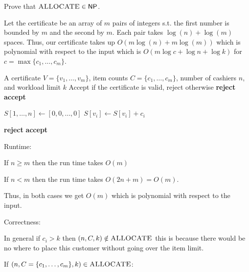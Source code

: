 \documentclass[12pt, letterpaper]{article}
\newcommand{\NP}{\mathsf{NP}}
\begin{document}
\begin{subproblem}{}
    Prove that $\textsc{ALLOCATE} \in \NP$.
\end{subproblem}
\begin{problemproof}
    Let the certificate be an array of $m$ pairs of integers s.t. the first number is bounded by $m$ and the second by $m$. Each pair takes $\log(n)+ \log(m)$ spaces. Thus, our certificate takes up $O(m \log(n) + m\log(m))$ which is polynomial with respect to the input which is $O(m \log c + \log n + \log k)$ for $c = \max\{c_1,\dots,c_m\}$.

    \begin{algorithm}[H]
        \caption{Verify Certificate for ALLOCATE}
        \begin{algorithmic}[1]
            \Require A certificate $V = \{v_1, \dots, v_m\}$, item counts $C=\{c_1,\dots,c_m\}$, number of cashiers $n$, and workload limit $k$
            \Ensure Accept if the certificate is valid, reject otherwise
                     \Return \textbf{reject}
                    \EndIf
                \EndFor
                \State \Return \textbf{accept}
            \EndIf

            \State $S[1,\dots,n] \gets [0,0,\dots,0]$
                \State $S[v_i] \gets S[v_i] + c_i$
            \EndFor

                 \Return \textbf{reject}
                \EndIf
            \EndFor
            \State \Return \textbf{accept}
        \end{algorithmic}
        \end{algorithm}
    
        Runtime: 
        
        If $n \geq m$ then the run time takes $O(m)$

        If $n < m$ then the run time takes $O(2n+m)=O(m)$.

        Thus, in both cases we get $O(m)$ which is polynomial with respect to the input.

        Correctness:

        In general if $c_i > k$ then $(n,C,k) \notin \textsc{ALLOCATE}$ this is because there would be no where to place this customer without going over the item limit.

        If $(n,C=\{c_1,\dots,c_m\},k) \in \textsc{ALLOCATE}$:


\end{problemproof}
\end{document}
